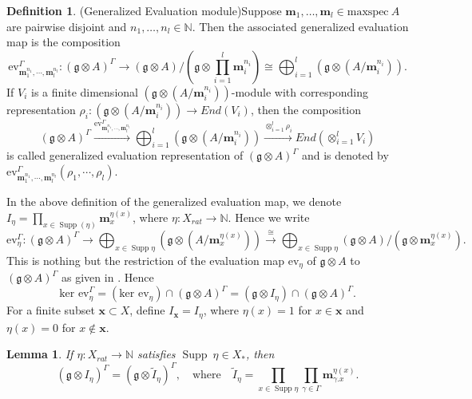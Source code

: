 \documentclass[11pt]{amsart}
\theoremstyle{plain}
\newtheorem{lemma}[thm]{Lemma}
\theoremstyle{definition}
\newtheorem{defn}[thm]{Definition}
\newcommand{\g}{\mathfrak{g}}
\DeclareMathOperator{\Supp}{Supp}
\begin{document}
\begin{defn}(Generalized Evaluation module)\label{def:12}
Suppose $\textbf{m}_{1},\ldots,\textbf{m}_{l}\in \mbox{maxspec}\ A$ are pairwise disjoint and $n_{1},\ldots,n_{l}\in\mathbb{N}$. Then the associated generalized evaluation map is the composition 
    \begin{equation*}
        \mbox{ev}^{\Gamma}_{\textbf{m}_{1}^{n_{1}},\cdots,\textbf{m}_{l}^{n_{l}}}:(\g\otimes A)^{\Gamma}\rightarrow(\g\otimes A)/(\g\otimes \prod_{i=1}^{l}\textbf{m}_{i}^{n_i})\cong\bigoplus_{i=1}^{l}(\g\otimes (A/\textbf{m}_{i}^{n_i})).
    \end{equation*}
    If $V_{i}$ is a finite dimensional $(\g\otimes(A/\textbf{m}_{i}^{n_{i}}))$-module with corresponding representation $\rho_{i}:(\g\otimes(A/\textbf{m}_{i}^{n_{i}}))\rightarrow End (V_{i})$, then the composition
    \begin{equation}
        (\g\otimes A)^{\Gamma}\xrightarrow{\mbox{ev}^{\Gamma}_{\textbf{m}_{1}^{n_{1}},\cdots,\textbf{m}_{l}^{n_{l}}}}\bigoplus_{i=1}^{l}(\g\otimes (A/\textbf{m}_{i}^{n_i}))\xrightarrow{\otimes_{i=1}^{l}\rho_{i}} End(\otimes_{i=1}^{l}V_{i})
    \end{equation}
    is called generalized evaluation representation of $(\g\otimes A)^{\Gamma}$ and is denoted by $\mbox{ev}^{\Gamma}_{\textbf{m}_{1}^{n_1},\cdots,\textbf{m}_{l}^{n_{l}}}(\rho_{1},\cdots,\rho_{l})$.
\end{defn}
In the above definition of the generalized evaluation map, we denote $I_{\eta}=\prod_{x\in \Supp(\eta
)}\textbf{m}_{x}^{\eta(x)}$, where $\eta:X_{rat}\rightarrow\mathbb{N}.$ 
Hence we write
\begin{equation*}
    \mbox{ev}^{\Gamma}_{\eta}:(\g\otimes A)^{\Gamma}\longrightarrow\bigoplus_{x\in   \Supp\eta}(\g\otimes (A/\textbf{m}_{x}^{\eta(x)}))\xrightarrow{\cong}\bigoplus_{x\in \Supp\eta}(\g\otimes A)/(\g\otimes \textbf{m}_{x}^{\eta(x)}).
\end{equation*}
This is nothing but the restriction of the evaluation map $\mbox{ev}_{\eta}$ of $\g\otimes A$ to $(\g\otimes A)^{\Gamma}$ as given in \cite[Eq 5.1]{Sav14}. Hence 
\begin{equation*}
    \mbox{ker ev}_{\eta}^{\Gamma}=(\mbox{ker ev}_{\eta})\cap(\g\otimes A)^{\Gamma}=(\g\otimes I_{\eta})\cap(\g\otimes A)^{\Gamma}.
\end{equation*}
 For a finite subset $\textbf{x}\subset X$, define $I_{\textbf{x}}=I_{\eta}$, where $\eta(x)=1$ for $x\in\textbf{x}$ and $\eta(x)=0$ for $x\notin\textbf{x}$.
\begin{lemma}\label{lem:10}
    If $\eta:X_{rat}\rightarrow\mathbb{N}$ satisfies $\Supp~\eta\in X_{*}$, then
    \begin{equation*}
        (\g\otimes I_{\eta})^{\Gamma}=(\g\otimes \tilde I_{\eta})^{\Gamma}, \quad \mbox{where}\quad \tilde I_{\eta}=\prod_{x\in \Supp\eta}\prod_{\gamma\in\Gamma}\textbf{m}_{\gamma.x}^{\eta(x)}.
    \end{equation*}
\end{lemma}
\end{document}
